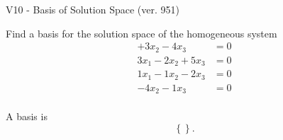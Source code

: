 \begin{exercise}
  \begin{exerciseTitle}V10 - Basis of Solution Space (ver. 951)\end{exerciseTitle}
  \begin{exerciseStatement}
    Find a basis for the solution space of the homogeneous system 
\begin{align*}
 + 3 x_ 2 -4 x_ 3 &= 0  \\ 
  3 x_ 1 -2 x_ 2 + 5 x_ 3 &= 0  \\ 
  1 x_ 1 -1 x_ 2 -2 x_ 3 &= 0  \\ 
  -4 x_ 2 -1 x_ 3 &= 0  \\ 
 \end{align*}


 
  \end{exerciseStatement}

  \begin{exerciseAnswer}
   A basis is   
\[\left\{\right\}.\]

  


  \end{exerciseAnswer}
\end{exercise}